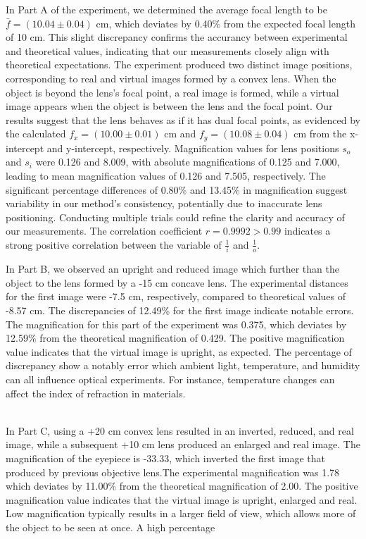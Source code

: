 \documentclass[a4paper,11pt]{article}
\begin{document}
In Part A of the experiment, we determined the average focal length to be \( \bar{f} = (10.04 \pm 0.04) \) cm, which deviates by 0.40\% from the expected focal length of 10 cm. This slight discrepancy confirms the accurancy between experimental and theoretical values, indicating that our measurements closely align with theoretical expectations. The experiment produced two distinct image positions, corresponding to real and virtual images formed by a convex lens. When the object is beyond the lens's focal point, a real image is formed, while a virtual image appears when the object is between the lens and the focal point. Our results suggest that the lens behaves as if it has dual focal points, as evidenced by the calculated \( f_x = (10.00 \pm 0.01) \) cm and \( f_y = (10.08 \pm 0.04) \) cm from the x-intercept and y-intercept, respectively. Magnification values for lens positions \( s_o \) and \( s_i \) were 0.126 and 8.009, with absolute magnifications of 0.125 and 7.000, leading to mean magnification values of 0.126 and 7.505, respectively. The significant percentage differences of 0.80\% and 13.45\% in magnification suggest variability in our method's consistency, potentially due to inaccurate lens positioning. Conducting multiple trials could refine the clarity and accuracy of our measurements. The correlation coefficient \( r = 0.9992 >0.99 \) indicates a strong positive correlation between the variable of \(\frac{1}{i}\) and \(\frac{1}{o}\).
\\
\par In Part B, we observed an upright and reduced image which further than the object to the lens  formed by a -15 cm concave lens. The experimental distances for the first  image were -7.5 cm, respectively, compared to theoretical values of -8.57 cm. The discrepancies of 12.49\% for the first image indicate notable errors. The magnification for this part of the experiment was 0.375, which deviates by 12.59\% from the theoretical magnification of 0.429. The positive magnification value indicates that the virtual image is upright, as expected. The percentage of discrepancy show a notably error which ambient light, temperature, and humidity can all influence optical experiments. For instance, temperature changes can affect the index of refraction in materials.\\
\\
\par In Part C, using a +20 cm convex lens resulted in an inverted, reduced, and real image, while a subsequent +10 cm lens produced an enlarged and real image. The magnification of the eyepiece is -33.33, which inverted the first image that produced by previous objective lens.The experimental magnification was 1.78 which deviates by 11.00\% from the theoretical magnification of 2.00. The positive magnification value indicates that the virtual image is upright, enlarged and real. Low magnification typically results in a larger field of view, which allows more of the object to be seen at once. A high percentage 
\end{document}
